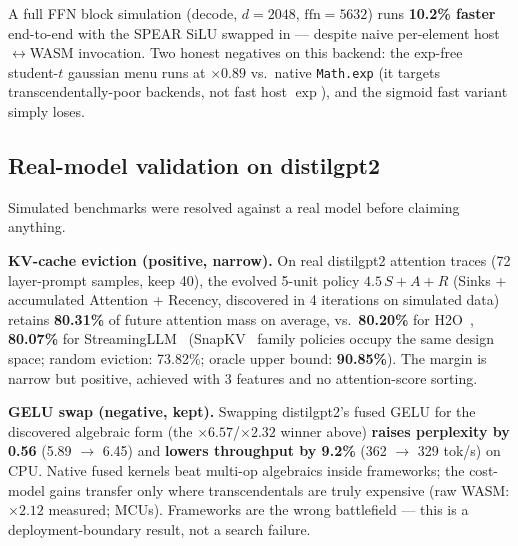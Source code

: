 \documentclass[11pt]{article}
\begin{document}
A full FFN block simulation (decode, $d=2048$, $\mathrm{ffn}=5632$) runs \textbf{10.2\% faster} end-to-end with the SPEAR SiLU swapped in --- despite naive per-element host$\leftrightarrow$WASM invocation. Two honest negatives on this backend: the exp-free student-$t$ gaussian menu runs at $\times0.89$ vs.\ native \texttt{Math.exp} (it targets transcendentally-poor backends, not fast host $\exp$), and the sigmoid fast variant simply loses.

\subsection{Real-model validation on distilgpt2}
\label{sec:realmodels}
Simulated benchmarks were resolved against a real model before claiming anything.

\textbf{KV-cache eviction (positive, narrow).} On real distilgpt2 attention traces (72 layer-prompt samples, keep 40), the evolved 5-unit policy $4.5\,S + A + R$ (Sinks + accumulated Attention + Recency, discovered in 4 iterations on simulated data) retains \textbf{80.31\%} of future attention mass on average, vs.\ \textbf{80.20\%} for H2O~\cite{zhang2023h2o}, \textbf{80.07\%} for StreamingLLM~\cite{xiao2024streamingllm} (SnapKV~\cite{li2024snapkv} family policies occupy the same design space; random eviction: 73.82\%; oracle upper bound: \textbf{90.85\%}). The margin is narrow but positive, achieved with 3 features and no attention-score sorting.

\textbf{GELU swap (negative, kept).} Swapping distilgpt2's fused GELU for the discovered algebraic form (the $\times6.57$/$\times2.32$ winner above) \textbf{raises perplexity by 0.56} (5.89 $\to$ 6.45) and \textbf{lowers throughput by 9.2\%} (362 $\to$ 329 tok/s) on CPU. Native fused kernels beat multi-op algebraics inside frameworks; the cost-model gains transfer only where transcendentals are truly expensive (raw WASM: $\times2.12$ measured; MCUs). Frameworks are the wrong battlefield --- this is a deployment-boundary result, not a search failure.
\end{document}
